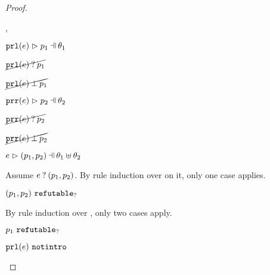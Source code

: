 \begin{proof}
\begin{byCases}
\begin{byCases}
        \begin{byCases}
        \item[\hpatmatch{\hprl{e}}{p_1}{\theta_1},\hpatmatch{\hprr{e}}{p_2}{\theta_2}]
            \begin{pfsteps*}
            \item $\hpatmatch{\hprl{e}}{p_1}{\theta_1}$  
            \item $\cancel{\mathtt{prl}(e) \mathbin{?} p_1}$  
            \item $\cancel{\mathtt{prl}(e) \mathbin{\bot} p_1}$  
            \item $\hpatmatch{\hprr{e}}{p_2}{\theta_2}$  
            \item $\cancel{\mathtt{prr}(e) \mathbin{?} p_2}$  
            \item $\cancel{\mathtt{prr}(e) \mathbin{\bot} p_2}$  
            \item $\hpatmatch{e}{\hpair{p_1}{p_2}}{\theta_1 \uplus \theta_2}$ 
            \end{pfsteps*}
            Assume $e \mathbin{?} (p_1 , p_2)$. By rule induction over  on it, only one case applies.
            \begin{byCases}
            \item[\text{(\ref{rule:MMNotIntro})}]
                \begin{pfsteps*}
                \item $(p_1 , p_2) ~\mathtt{refutable}_?$  
                \end{pfsteps*}
                By rule induction over , only two cases apply.
                \begin{byCases}
                \item[\text{(\ref{rule:RPairL})}]
                    \begin{pfsteps*}
                    \item $p_1 ~\mathtt{refutable}_?$  
                    \item $\mathtt{prl}(e) ~\mathtt{notintro}$  

\end{pfsteps*}
\end{byCases}
\end{byCases}
\end{byCases}
\end{byCases}
\end{byCases}
\end{proof}
